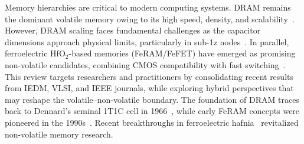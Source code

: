 Memory hierarchies are critical to modern computing systems. 
DRAM remains the dominant volatile memory owing to its high speed, density, and scalability~\cite{choi2022, kim2021_dram}. 
However, DRAM scaling faces fundamental challenges as the capacitor dimensions approach physical limits, particularly in sub-1z nodes~\cite{lee2020_dram, iedm2023_dram}. 
In parallel, ferroelectric HfO$_2$-based memories (FeRAM/FeFET) have emerged as promising non-volatile candidates, combining CMOS compatibility with fast switching~\cite{boscke2011, mueller2012}. 
This review targets researchers and practitioners by consolidating recent results from IEDM, VLSI, and IEEE journals, while exploring hybrid perspectives that may reshape the volatile–non-volatile boundary.
The foundation of DRAM traces back to Dennard’s seminal 1T1C cell in 1966~\cite{dennard1966}, 
while early FeRAM concepts were pioneered in the 1990s~\cite{scott1998}. 
Recent breakthroughs in ferroelectric hafnia~\cite{boscke2011, mueller2012} revitalized non-volatile memory research.
